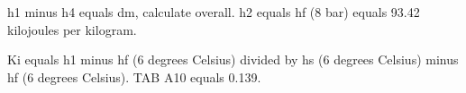 h1 minus h4 equals dm, calculate overall.  
h2 equals hf (8 bar) equals 93.42 kilojoules per kilogram.  

Ki equals h1 minus hf (6 degrees Celsius) divided by hs (6 degrees Celsius) minus hf (6 degrees Celsius).  
TAB A10 equals 0.139.